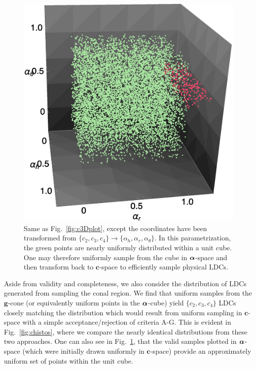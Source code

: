 \begin{figure}
\includegraphics[width=\columnwidth]{alpha3Dplot.eps}
\caption{
Same as Fig.~\ref{fig:c3Dplot}, except the coordinates have been transformed
from $\{c_2,c_3,c_4\}\to\{\alpha_h,\alpha_r,\alpha_{\theta}\}$. In this 
parametrization, the green points are nearly uniformly distributed within a
unit cube. One may therefore uniformly sample from the cube in 
$\boldsymbol{\alpha}$-space and then transform back to $\mathbf{c}$-space to efficiently
sample physical LDCs.
}
\label{fig:alpha3Dplot}
\end{figure}

Aside from validity and completeness, we also consider the distribution of LDCs
generated from sampling the conal region. We find that uniform samples from the
$\mathbf{g}$-cone (or equivalently uniform points in the $\boldsymbol{\alpha}$-cube)
yield $\{c_2,c_3,c_4\}$ LDCs closely matching the distribution which would
result from uniform sampling in $\mathbf{c}$-space with a simple 
acceptance/rejection of criteria A-G. This is evident in 
Fig.~\ref{fig:chistos}, where we compare the nearly identical distributions 
from these two approaches. One can also see in Fig.~\ref{fig:alpha3Dplot}, 
that the valid samples plotted in $\boldsymbol{\alpha}$-space (which were initially drawn 
uniformly in $\mathbf{c}$-space) provide an approximately uniform set of points 
within the unit cube.

